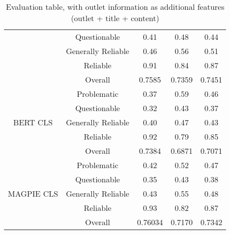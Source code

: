 \begin{table}[htbp]
\begin{tabular}{| c | c | c | c | c |}
                                                 & Questionable       & 0.41      & 0.48   & 0.44   \\
                                                 & Generally Reliable & 0.46      & 0.56   & 0.51   \\
                                                 & Reliable           & 0.91      & 0.84   & 0.87   \\
                                                 & Overall            & 0.7585    & 0.7359 & 0.7451 \\
        \hline
        \multirow{5}{*}{BERT CLS}                & Problematic        & 0.37      & 0.59   & 0.46   \\
                                                 & Questionable       & 0.32      & 0.43   & 0.37   \\
                                                 & Generally Reliable & 0.40      & 0.47   & 0.43   \\
                                                 & Reliable           & 0.92      & 0.79   & 0.85   \\
                                                 & Overall            & 0.7384    & 0.6871 & 0.7071 \\
        \hline
        \multirow{5}{*}{MAGPIE CLS}              & Problematic        & 0.42      & 0.52   & 0.47   \\
                                                 & Questionable       & 0.35      & 0.43   & 0.38   \\
                                                 & Generally Reliable & 0.43      & 0.55   & 0.48   \\
                                                 & Reliable           & 0.93      & 0.82   & 0.87   \\
                                                 & Overall            & 0.76034   & 0.7170 & 0.7342 \\
        \hline
    \end{tabular}
    \caption{Evaluation table, with outlet information as additional features (outlet + title + content)}
    \label{table:eval-outlet}
\end{table}


